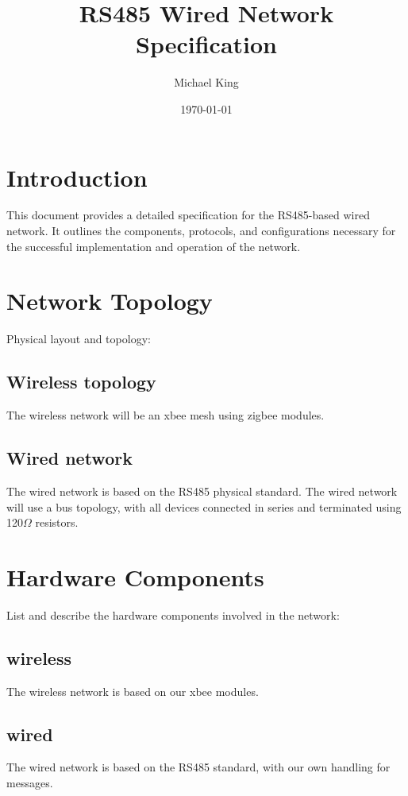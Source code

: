 \documentclass[a4paper,12pt]{article}
\begin{document}
	
	\title{RS485 Wired Network Specification}
	\author{Michael King}
	\date{\today}
	
	\maketitle
	
	\section{Introduction}
	
	This document provides a detailed specification for the RS485-based wired network. It outlines the components, protocols, and configurations necessary for the successful implementation and operation of the network.
	
	\section{Network Topology}
	
	Physical layout and topology:
	
	\subsection{Wireless topology}
	The wireless network will be an xbee mesh using zigbee modules.
	
	\subsection{Wired network}
	The wired network is based on the RS485 physical standard.
	The wired network will use a bus topology, with all devices connected in series and terminated using 120$\Omega$ resistors.
	
	\section{Hardware Components}
	
	List and describe the hardware components involved in the network:
	\subsection{wireless}
	The wireless network is based on our xbee modules.
	\subsection{wired}
	The wired network is based on the RS485 standard, with our own handling for messages.
\end{document}
